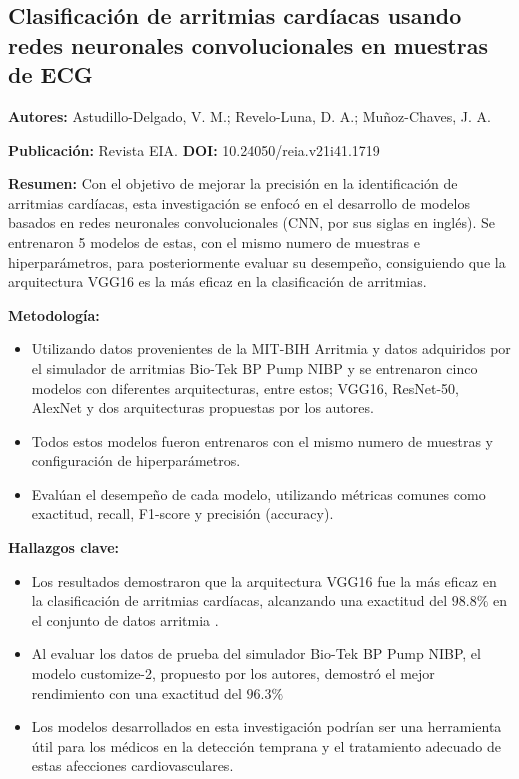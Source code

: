 \documentclass[spanish,11pt,letterpaper,oneside]{memoir}
\begin{document}
\subsection{Clasificación de arritmias cardíacas usando redes neuronales convolucionales en muestras de ECG \cite{Astudillo24}}
\textbf{Autores:} Astudillo-Delgado, V. M.; Revelo-Luna, D. A.; Muñoz-Chaves, J. A.

\textbf{Publicación:} Revista EIA.
\textbf{DOI:} 10.24050/reia.v21i41.1719

\textbf{Resumen:} Con el objetivo de mejorar la precisión en la identificación de arritmias cardíacas, esta investigación se enfocó en el desarrollo de modelos basados en redes neuronales convolucionales (CNN, por sus siglas en inglés). Se entrenaron 5 modelos de estas, con el mismo numero de muestras e hiperparámetros, para posteriormente evaluar su desempeño, consiguiendo que la arquitectura VGG16 es la más eficaz en la clasificación de arritmias.

\textbf{Metodología:}
\begin{itemize}
	\item Utilizando datos provenientes de la MIT-BIH Arritmia \cite{arritmiadb} y datos adquiridos por el simulador de arritmias Bio-Tek BP Pump NIBP y se entrenaron cinco modelos con diferentes arquitecturas, entre estos; VGG16, ResNet-50, AlexNet y dos arquitecturas propuestas por los autores.
	\item Todos estos modelos fueron entrenaros con el mismo numero de muestras y configuración de hiperparámetros.
	\item Evalúan el desempeño de cada modelo, utilizando métricas comunes como exactitud, recall, F1-score y precisión (accuracy).
\end{itemize}

\textbf{Hallazgos clave:}
\begin{itemize}
	\item Los resultados demostraron que la arquitectura VGG16 fue la más eficaz en la clasificación de arritmias cardíacas, alcanzando una exactitud del $98.8\%$ en el conjunto de datos arritmia \cite{arritmiadb}. 
	\item Al evaluar los datos de prueba del simulador Bio-Tek BP Pump NIBP, el modelo customize-2, propuesto por los autores, demostró el mejor rendimiento con una exactitud del $96.3\%$
	\item Los modelos desarrollados en esta investigación podrían ser una herramienta útil para los médicos en la detección temprana y el tratamiento adecuado de estas afecciones cardiovasculares.
\end{itemize}
\end{document}
